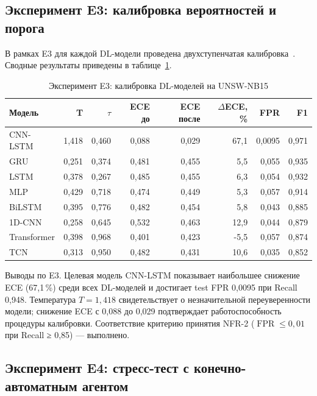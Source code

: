 \subsection{Эксперимент E3: калибровка вероятностей и порога}

В рамках E3 для каждой DL-модели проведена двухступенчатая
калибровка~\cite{guo2017calibration}. Сводные результаты приведены
в таблице~\ref{tab:E3-calibration}.

\begin{table}[H]
\caption{Эксперимент E3: калибровка DL-моделей на UNSW-NB15}
\label{tab:E3-calibration}
\centering
\small
\begin{tabular}{|l|r|r|r|r|r|r|r|}
\hline
Модель & T & $\tau$ & ECE до & ECE после & $\Delta$ECE, \% & FPR & F1 \\
\hline
CNN-LSTM & 1,418 & 0,460 & 0,088 & 0,029 & 67,1 & 0,0095 & 0,971 \\
\hline
GRU         & 0,251 & 0,374 & 0,481 & 0,455 & 5,5  & 0,055 & 0,935 \\
\hline
LSTM        & 0,378 & 0,267 & 0,485 & 0,455 & 6,3  & 0,054 & 0,932 \\
\hline
MLP         & 0,429 & 0,718 & 0,474 & 0,449 & 5,3  & 0,057 & 0,914 \\
\hline
BiLSTM      & 0,395 & 0,776 & 0,482 & 0,454 & 5,8  & 0,043 & 0,885 \\
\hline
1D-CNN      & 0,258 & 0,645 & 0,532 & 0,463 & 12,9 & 0,044 & 0,879 \\
\hline
Transformer & 0,398 & 0,968 & 0,401 & 0,423 & -5,5 & 0,057 & 0,874 \\
\hline
TCN         & 0,313 & 0,950 & 0,482 & 0,431 & 10,6 & 0,035 & 0,852 \\
\hline
\end{tabular}
\end{table}

Выводы по E3. Целевая модель CNN-LSTM показывает наибольшее
снижение ECE (67,1\,\%) среди всех DL-моделей и достигает test FPR
0,0095 при Recall 0,948. Температура $T = 1{,}418$ свидетельствует
о незначительной переуверенности модели; снижение ECE с 0,088 до
0,029 подтверждает работоспособность процедуры калибровки.
Соответствие критерию принятия NFR-2 ($\operatorname{FPR} \leq
0{,}01$ при Recall ≥ 0,85) --- выполнено.

\subsection{Эксперимент E4: стресс-тест с конечно-автоматным агентом}
\label{subsec:E4}

